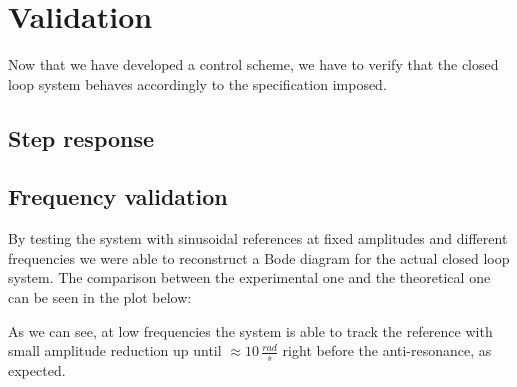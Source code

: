 
\section{Validation}

Now that we have developed a control scheme, we have to verify that the closed loop system behaves accordingly to the specification imposed. 

\subsection{Step response}




\subsection{Frequency validation}

By testing the system with sinusoidal references at fixed amplitudes and different frequencies we were able to reconstruct a Bode diagram for the actual closed loop system. The comparison between the experimental one and the theoretical one can be seen in the plot below:


As we can see, at low frequencies the system is able to track the reference with small amplitude reduction up until $\approx 10 \, \frac{rad}{s}$ right before the anti-resonance, as expected.
